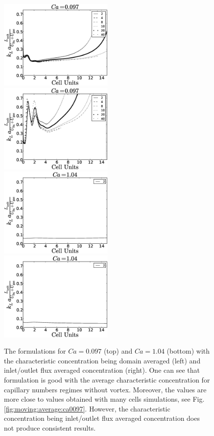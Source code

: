 \documentclass{article}
\begin{document}
\begin{figure}
\includegraphics[width=0.5\textwidth]{Figures/vanbaten_aver_scale_ca097.eps}
\includegraphics[width=0.5\textwidth]{Figures/vanbaten_full_scale_ca097.eps}\\
\includegraphics[width=0.5\textwidth]{Figures/vanbaten_aver_scale_ca14.eps}
\includegraphics[width=0.5\textwidth]{Figures/vanbaten_full_scale_ca14.eps}\\
\caption{The \citet{vanbaten-circular} formulations for $Ca=0.097$ (top) and
$Ca=1.04$ (bottom) with the characteristic concentration being domain
averaged (left) and inlet/outlet flux averaged concentration (right). One can
see that \citet{vanbaten-circular} formulation is good with the average
characteristic concentration for capillary numbers regimes without
vortex. Moreover, the values are more close to values obtained with many cells
simulations, see Fig. \ref{fig:moving:average:ca0097}. However, the characteristic concentration
being inlet/outlet flux averaged concentration does not produce consistent results.
\label{fig:vanbaten}}
\end{figure}
\end{document}
